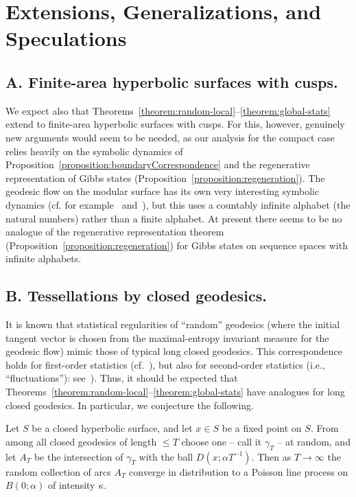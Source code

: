 \documentclass[10pt]{amsart}
\theoremstyle{definition}\newtheorem{defi}[theo]{Definition}\newtheorem{rema}[theo]{Remark}\newtheorem{exam}[theo]{Example}\newtheorem{exem}[theo]{Example}\newtheorem{nota}[theo]{Notation}
\begin{document}
\section{Extensions, Generalizations, and Speculations}\label{sec:ext}



\subsection*{A. Finite-area hyperbolic surfaces with cusps.}
We expect also that Theorems~\ref{theorem:random-local}--\ref{theorem:global-stats} extend to finite-area hyperbolic surfaces with cusps. For this, however, genuinely new arguments would seem to be needed, as our analysis for the compact case relies heavily on the symbolic dynamics of Proposition~\ref{proposition:boundaryCorrespondence} and the regenerative representation of Gibbs states (Proposition~\ref{proposition:regeneration}). The geodesic flow on the modular surface has its own very interesting symbolic dynamics (cf. for example~\cite{series:modular} and~\cite{adler-flatto:cross-section-map}), but this uses a countably infinite alphabet (the natural numbers) rather than a finite alphabet. At present there seems to be no analogue of the regenerative representation theorem (Proposition~\ref{proposition:regeneration}) for Gibbs states on sequence spaces with infinite alphabets.
%
\subsection*{B. Tessellations by closed geodesics.}
It is known that statistical regularities of ``random'' geodesics (where the initial tangent vector is chosen from the maximal-entropy invariant measure for the geodesic flow) mimic those of typical long closed geodesics. This correspondence holds for first-order statistics (cf.~\cite{bowen:equidistribution}), but also for second-order statistics (i.e., ``fluctuations''): see~\cite{lalley:duke,lalley:axiomA,lalley:homology}). Thus, it should be expected that Theorems~\ref{theorem:random-local}--\ref{theorem:global-stats} have analogues for long closed geodesics. In particular, we conjecture the following.

\begin{conj}\label{conj:closed}
Let $S$ be a closed hyperbolic surface, and let $x\in S$ be a fixed point on $S$. From among all closed geodesics of length $\leq T$ choose one -- call it $\gamma_{T}$ -- at random, and let $A_{T}$ be the intersection of $\gamma_{T}$ with the ball $D (x;\alpha T^{-1})$. Then as $T \rightarrow \infty$ the random collection of arcs $A_{T}$ converge in distribution to a Poisson line process on $B (0;\alpha)$ of intensity $\kappa$.
\end{conj}
\end{document}
